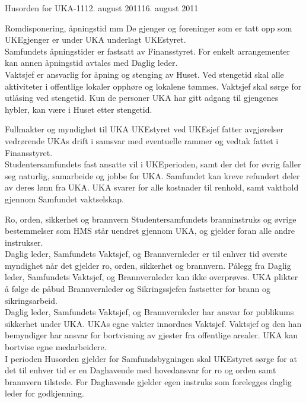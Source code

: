 \documentclass[../fsbok.tex]{subfiles}
\begin{document}
\begin{instruks}{Husorden for UKA-11}{12. august 2011}{16. august 2011}
\begin{instruksledd}{Romdisponering, åpningstid mm}
De gjenger og foreninger som er tatt opp som UKEgjenger er under UKA
underlagt UKEstyret.\\

Samfundets åpningstider er fastsatt av Finansstyret. For enkelt arrangementer
kan annen åpningstid avtales med Daglig leder.\\

Vaktsjef er ansvarlig for åpning og stenging av Huset. Ved stengetid skal alle
aktiviteter i offentlige lokaler opphøre og lokalene tømmes. Vaktsjef skal sørge
for utlåsing ved stengetid. Kun de personer UKA har gitt adgang til gjengenes
hybler, kan være i Huset etter stengetid.
\end{instruksledd}

\begin{instruksledd}{Fullmakter og myndighet til UKA}
UKEstyret ved UKEsjef fatter avgjørelser vedrørende UKAs drift i samsvar med
eventuelle rammer og vedtak fattet i Finansstyret.\\

Studentersamfundets fast ansatte vil i UKEperioden, samt der det for øvrig faller
seg naturlig, samarbeide og jobbe for UKA. Samfundet kan kreve refundert deler
av deres lønn fra UKA. UKA svarer for alle kostnader til renhold, samt vakthold
gjennom Samfundet vaktselskap.
\end{instruksledd}

\begin{instruksledd}{Ro, orden, sikkerhet og brannvern}
Studentersamfundets branninstruks og øvrige bestemmelser som HMS står
uendret gjennom UKA, og gjelder foran alle andre instrukser.\\

Daglig leder, Samfundets Vaktsjef, og Brannvernleder er til enhver tid øverste
myndighet når det gjelder ro, orden, sikkerhet og brannvern. Pålegg fra Daglig
leder, Samfundets Vaktsjef, og Brannvernleder kan ikke overprøves. UKA plikter
å følge de påbud Brannvernleder og Sikringssjefen fastsetter for brann og
sikringsarbeid.\\

Daglig leder, Samfundets Vaktsjef, og Brannvernleder har ansvar for publikums
sikkerhet under UKA. UKAs egne vakter innordnes Vaktsjef. Vaktsjef og den han
bemyndiger har ansvar for bortvisning av gjester fra offentlige arealer. UKA kan
bortvise egne medarbeidere.\\

I perioden Husorden gjelder for Samfundsbygningen skal UKEstyret sørge for at
det til enhver tid er en Daghavende med hovedansvar for ro og orden samt
brannvern tilstede. For Daghavende gjelder egen instruks som forelegges daglig
leder for godkjenning.\\


\end{instruksledd}
\end{instruks}
\end{document}
